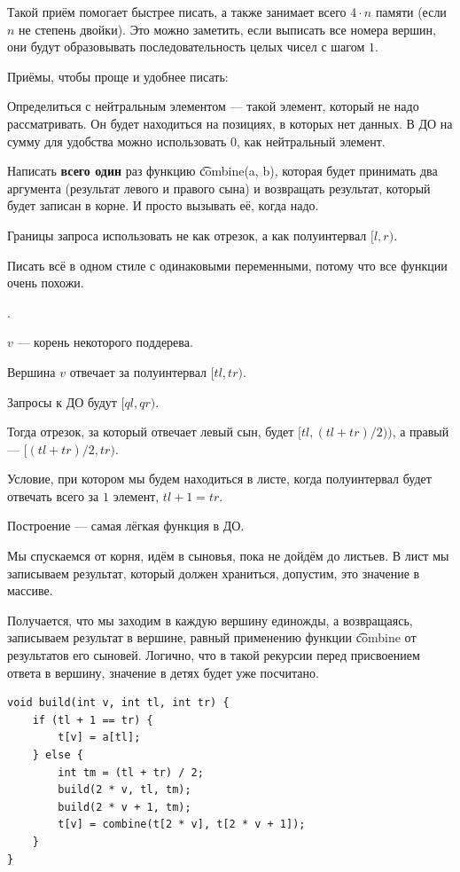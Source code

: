 Такой приём помогает быстрее писать, а также занимает всего $4 \cdot n$ памяти (если $n$ не степень двойки). Это можно заметить, если выписать все номера вершин, они будут образовывать последовательность целых чисел с шагом $1$.

Приёмы, чтобы проще и удобнее писать:

\up \up
\begin{MyList}[0pt]
	\item Определиться с нейтральным элементом --- такой элемент, который не надо рассматривать. Он будет находиться на позициях, в которых нет данных. В ДО на сумму для удобства можно использовать $0$, как нейтральный элемент.
	\item Написать {\bf всего один} раз функцию \t{combine(a, b)}, которая будет принимать два аргумента (результат левого и правого сына) и возвращать результат, который будет записан в корне. И просто вызывать её, когда надо.
	\item Границы запроса использовать не как отрезок, а как полуинтервал $[l, r)$.
	\item Писать всё в одном стиле с одинаковыми переменными, потому что все функции очень похожи.
\end{MyList} \up \up

.

$v$ --- корень некоторого поддерева.

Вершина $v$ отвечает за полуинтервал $[tl, tr)$.

Запросы к ДО будут $[ql, qr)$.

Тогда отрезок, за который отвечает левый сын, будет $[tl, (tl + tr) / 2))$, а правый --- $[(tl + tr) / 2, tr)$.

Условие, при котором мы будем находиться в листе, когда полуинтервал будет отвечать всего за $1$ элемент, $tl + 1 = tr$.


\pagebreak


Построение --- самая лёгкая функция в ДО. 

Мы спускаемся от корня, идём в сыновья, пока не дойдём до листьев. В лист мы записываем результат, который должен храниться, допустим, это значение в массиве.

Получается, что мы заходим в каждую вершину единожды, а возвращаясь, записываем результат в вершине, равный применению функции \t{combine} от результатов его сыновей. Логично, что в такой рекурсии перед присвоением ответа в вершину, значение в детях будет уже посчитано.
\up \up
\begin{verbatim}
void build(int v, int tl, int tr) {
	if (tl + 1 == tr) {
		t[v] = a[tl];
	} else {
		int tm = (tl + tr) / 2;
		build(2 * v, tl, tm);
		build(2 * v + 1, tm);
		t[v] = combine(t[2 * v], t[2 * v + 1]);
	}
}
\end{verbatim}
\up \up

